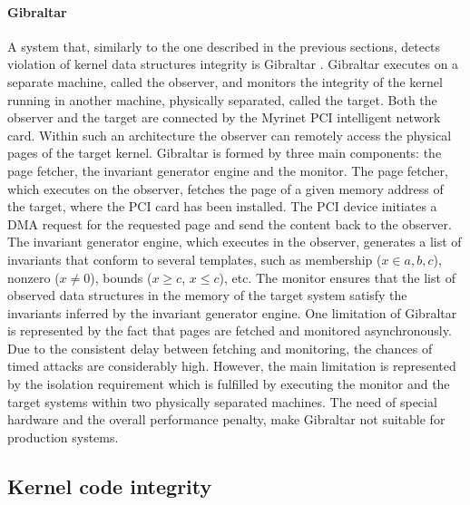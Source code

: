 \paragraph{Gibraltar}
A system that, similarly to the one described in the previous sections, detects violation of kernel data structures integrity is Gibraltar \cite{6}. Gibraltar executes on a separate machine, called the observer, and monitors the integrity of the kernel running in another machine, physically separated, called the target. Both the observer and the target are connected by the Myrinet PCI intelligent network card. Within such an architecture the observer can remotely access the physical pages of the target kernel. Gibraltar is formed by three main components: the page fetcher, the invariant generator engine and the monitor. The page fetcher, which executes on the observer, fetches the page of a given memory address of the target, where the PCI card has been installed. The PCI device initiates a DMA request for the requested page and send the content back to the observer.
The invariant generator engine, which executes in the observer, generates a list of invariants that conform to several templates, such as membership ($x \in a,b,c$), nonzero ($x \neq 0$), bounds ($x \geq c$, $x \leq c$), etc. The monitor ensures that the list of observed data structures in the memory of the target system satisfy the invariants inferred by the invariant generator engine.
One limitation of Gibraltar is represented by the fact that pages are fetched and monitored asynchronously. Due to the consistent delay between fetching and monitoring, the chances of timed attacks are considerably high.
However, the main limitation is represented by the isolation requirement which is fulfilled by executing the monitor and the target systems within two physically separated machines. The need of special hardware and the overall performance penalty, make Gibraltar not suitable for production systems.  



\subsection{Kernel code integrity} \label{integrity}

